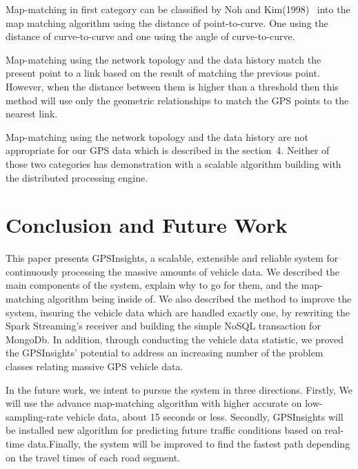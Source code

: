 \documentclass{acm_proc_article-sp}
\begin{document}
		\setlength{\parindent}{0.7cm} Map-matching in first category can be classified by Noh and Kim(1998)~\cite{noh1998map} into the map matching algorithm using the distance of point-to-curve. One using the distance of curve-to-curve and one using the angle of curve-to-curve.
		
		\setlength{\parindent}{0.7cm} Map-matching using the network topology and the data history match the present point to a link based on the result of matching the previous point. However, when the distance between them is higher than a threshold then this method will use only the geometric relationships to match the GPS points to the nearest link.
		
		\setlength{\parindent}{0.7cm} Map-matching using the network topology and the data history are not appropriate for our GPS data which is described in the section~4. Neither of those two categories has demonstration with a scalable algorithm building with the distributed processing engine. 
			
\section{Conclusion and Future Work}
This paper presents GPSInsights, a scalable, extensible and reliable system for continuously processing the massive amounts of vehicle data. We described the main components of the system, explain why to go for them, and the map-matching algorithm being inside of. We also described the method to improve the system, insuring the vehicle data which are handled exactly one, by rewriting the Spark Streaming's receiver and building the simple NoSQL transaction for MongoDb. In addition, through conducting the vehicle data statistic, we proved the GPSInsights' potential to address an increasing number of the problem classes relating massive GPS vehicle data.

In the future work, we intent to pursue the system in three directions. Firstly, We will use the advance map-matching algorithm with higher accurate on low-sampling-rate vehicle data, about 15 seconds or less. Secondly, GPSInsights will be installed new algorithm for predicting future traffic conditions based on real-time data.Finally, the system will be improved to find the fastest path depending on the travel times of each road segment.
%

%
%
\appendix \label{appendix}
\end{document}
